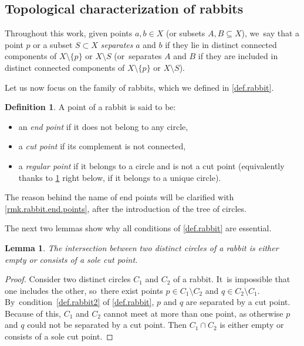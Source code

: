 \documentclass[10pt,a4paper]{amsart}
\newtheorem{lemma}[lemma]{Lemma}
\theoremstyle{definition}
\newtheorem{definition}[definition]{Definition}
\begin{document}
\subsection{Topological characterization of rabbits}

Throughout this work, given points $a,b \in X$ (or subsets $A,B \subseteq X$), we~say that a point $p$ or a subset $S \subset X$ \emph{separates} $a$ and $b$ if they lie in distinct connected components of $X \setminus \{p\}$ or $X \setminus S$ (or~separates $A$ and $B$ if they are included in distinct connected components of $X \setminus \{p\}$ or $X \setminus S$).

Let us now focus on the family of rabbits, which we defined in \cref{def.rabbit}.


\setcounter{theorem}{1}
\begin{definition}
\label{def.rabbit.points}
A point of a rabbit is said to be:
\begin{itemize}
\item an \emph{end point} if it does not belong to any circle,
\item a \emph{cut point} if its complement is not connected,
\item a \emph{regular point} if it belongs to a circle and is not a cut point (equivalently thanks to \cref{lem.circles.intersection} right below, if it belongs to a unique circle).
\end{itemize}
\end{definition}

The reason behind the name of end points will be clarified with \cref{rmk.rabbit.end.points}, after the introduction of the tree of circles.

The next two lemmas show why all conditions of \cref{def.rabbit} are essential.

\begin{lemma}
\label{lem.circles.intersection}
The intersection between two distinct circles of a rabbit is either empty or consists of a sole cut point.
\end{lemma}

\begin{proof}
Consider two distinct circles $C_1$ and $C_2$ of a rabbit. It~is impossible that one includes the other, so~there exist points $p \in C_1 \setminus C_2$ and $q \in C_2 \setminus C_1$. By~condition~\cref{def.rabbit2} of \cref{def.rabbit}, $p$ and $q$ are separated by a cut point.
Because of this, $C_1$ and $C_2$ cannot meet at more than one point, as otherwise $p$ and $q$ could not be separated by a cut point.
Then $C_1 \cap C_2$ is either empty or consists of a sole cut point.
\end{proof}
\end{document}
